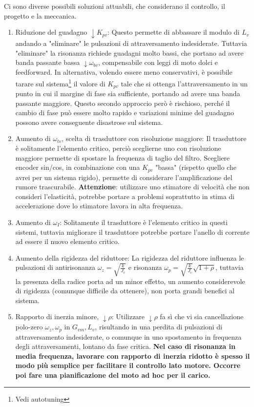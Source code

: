 Ci sono diverse possibili soluzioni attuabili, che considerano il controllo, il progetto e la meccanica.
\begin{enumerate}[label=\roman*.]
    \item Riduzione del guadagno \(\downarrow K_{pv}\): Questo permette di abbassare il modulo di \(L_v\) andando a "eliminare" le pulsazioni di attraversamento indesiderate. Tuttavia "eliminare" la risonanza richiede guadagni molto bassi, che portano ad avere banda passante bassa \(\downarrow \omega_{bv}\), compensabile con leggi di moto dolci e feedforward.
    In alternativa, volendo essere meno conservativi, è possibile tarare sul sistema\footnote{Vedi autotuning} il valore di \(K_{pv}\) tale che si ottenga l'attraversamento in un punto in cui il margine di fase sia sufficiente, portando ad avere una banda passante maggiore. Questo secondo approccio però è rischioso, perché il cambio di fase può essere molto rapido e variazioni minime del guadagno possono avere conseguente disastrose sul sistema.
    \item Aumento di \(\omega_{tv}\), scelta di trasduttore con risoluzione maggiore: Il trasduttore è solitamente l'elemento critico, perciò sceglierne uno con risoluzione maggiore permette di spostare la frequenza di taglio del filtro. Scegliere encoder sin/cos, in combinazione con una \(K_{pv}\) "bassa" (rispetto quello che avrei per un sistema rigido), permette di considerare l'amplificazione del rumore trascurabile.
    \textbf{Attenzione}: utilizzare uno stimatore di velocità che non consideri l'elasticità, potrebbe portare a problemi soprattutto in stima di accelerazione dove lo stimatore lavora in alta frequenza.
    \item Aumento di \(\omega_I\): Solitamente il trasduttore è l'elemento critico in questi sistemi, tuttavia migliorare il trasduttore potrebbe portare l'anello di corrente ad essere il nuovo elemento critico.
    \item Aumento della rigidezza del riduttore: La rigidezza del riduttore influenza le pulsazioni di antirisonanza \(\omega_z = \sqrt{\frac{k}{J_c}}\) e risonanza \(\omega_p = \sqrt{\frac{k}{J_c}}\sqrt{1+\rho}\), tuttavia la presenza della radice porta ad un minor effetto, un aumento considerevole di rigidezza (comunque difficile da ottenere), non porta grandi benefici al sistema. 
    \item Rapporto di inerzia minore, \(\downarrow \rho\): Utilizzare \(\downarrow \rho\) fa sì che vi sia cancellazione polo-zero \(\omega_z,\omega_p\) in \(G_{vm}, L_v\), risultando in una perdita di pulsazioni di attraversamento indesiderate, o comunque in uno spostamento in frequenza degli attraversamenti, lontano da fase critica. \textbf{Nel caso di risonanza in media frequenza, lavorare con rapporto di inerzia ridotto è spesso il modo più semplice per facilitare il controllo lato motore. Occorre poi fare una pianificazione del moto ad hoc per il carico.}

\end{enumerate}
